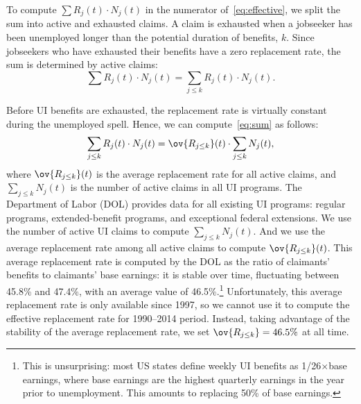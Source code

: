 \documentclass[letterpaper,12pt,leqno]{article}
\begin{document}
To compute $\sum R_j(t) \cdot N_j(t)$ in the numerator of~\eqref{eq:effective}, we split the sum into active and exhausted claims. A claim is exhausted when a jobseeker has been unemployed longer than the potential duration of benefits, $k$. Since jobseekers who have exhausted their benefits have a zero replacement rate, the sum is determined by active claims:
\begin{equation}
\sum R_j(t) \cdot N_j(t) = \sum_{j\leq k} R_j(t) \cdot N_j(t).
\label{eq:sum}\end{equation}

Before UI benefits are exhausted, the replacement rate is virtually constant during the unemployed spell. Hence, we can compute~\eqref{eq:sum} as follows:
\begin{equation*}
\sum_{j\leq k} R_j(t) \cdot N_j(t) = \ov{R_{j\leq k}}(t)\cdot \sum_{j\leq k}  N_j(t),
\end{equation*}
where $\ov{R_{j\leq k}}(t)$ is the average replacement rate for all active claims, and $\sum_{j\leq k}  N_j(t)$ is the number of active claims in all UI programs. The Department of Labor (DOL) provides data for all existing UI programs: regular programs, extended-benefit programs, and exceptional federal extensions. We use the number of active UI claims to compute $\sum_{j\leq k} N_j(t)$. And we use the average replacement rate among all active claims to compute $\ov{R_{j\leq k}}(t)$. This average replacement rate is computed by the DOL as the ratio of claimants' benefits to claimants' base earnings: it is stable over time, fluctuating between 45.8\% and 47.4\%, with an average value of 46.5\%.\footnote{This is unsurprising: most US states define weekly UI benefits as 1/26$\times$base earnings, where base earnings are the highest quarterly earnings in the year prior to unemployment. This amounts to replacing 50\% of base earnings.} Unfortunately, this average replacement rate is only available since 1997, so we cannot use it to compute the effective replacement rate for 1990--2014 period. Instead, taking advantage of the stability of the average replacement rate, we set $\ov{R_{j\leq k}}=46.5\%$ at all time.
\end{document}
